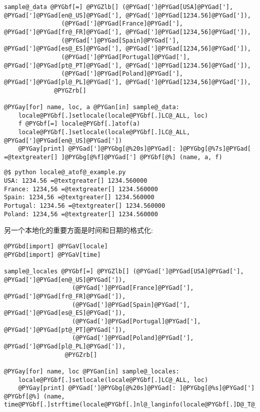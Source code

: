 \documentclass[letterpaper,10pt,english]{manual}
\begin{document}
\begin{Verbatim}[commandchars=@\[\]]
sample@_data @PYGbf[=] @PYGZlb[] (@PYGad[']@PYGad[USA]@PYGad['], @PYGad[']@PYGad[en@_US]@PYGad['], @PYGad[']@PYGad[1234.56]@PYGad[']),
                (@PYGad[']@PYGad[France]@PYGad['], @PYGad[']@PYGad[fr@_FR]@PYGad['], @PYGad[']@PYGad[1234,56]@PYGad[']),
                (@PYGad[']@PYGad[Spain]@PYGad['], @PYGad[']@PYGad[es@_ES]@PYGad['], @PYGad[']@PYGad[1234,56]@PYGad[']),
                (@PYGad[']@PYGad[Portugal]@PYGad['], @PYGad[']@PYGad[pt@_PT]@PYGad['], @PYGad[']@PYGad[1234.56]@PYGad[']),
                (@PYGad[']@PYGad[Poland]@PYGad['], @PYGad[']@PYGad[pl@_PL]@PYGad['], @PYGad[']@PYGad[1234,56]@PYGad[']),
              @PYGZrb[]

@PYGay[for] name, loc, a @PYGan[in] sample@_data:
    locale@PYGbf[.]setlocale(locale@PYGbf[.]LC@_ALL, loc)
    f @PYGbf[=] locale@PYGbf[.]atof(a)
    locale@PYGbf[.]setlocale(locale@PYGbf[.]LC@_ALL, @PYGad[']@PYGad[en@_US]@PYGad['])
    @PYGay[print] @PYGad[']@PYGbg[@%20s]@PYGad[: ]@PYGbg[@%7s]@PYGad[ =@textgreater[] ]@PYGbg[@%f]@PYGad['] @PYGbf[@%] (name, a, f)
\end{Verbatim}

\begin{Verbatim}[commandchars=@\[\]]
@$ python locale@_atof@_example.py
USA: 1234.56 =@textgreater[] 1234.560000
France: 1234,56 =@textgreater[] 1234.560000
Spain: 1234,56 =@textgreater[] 1234.560000
Portugal: 1234.56 =@textgreater[] 1234.560000
Poland: 1234,56 =@textgreater[] 1234.560000
\end{Verbatim}

另一个本地化的重要方面是时间和日期的格式化:

\begin{Verbatim}[commandchars=@\[\]]
@PYGbd[import] @PYGaV[locale]
@PYGbd[import] @PYGaV[time]

sample@_locales @PYGbf[=] @PYGZlb[] (@PYGad[']@PYGad[USA]@PYGad['], @PYGad[']@PYGad[en@_US]@PYGad[']),
                   (@PYGad[']@PYGad[France]@PYGad['], @PYGad[']@PYGad[fr@_FR]@PYGad[']),
                   (@PYGad[']@PYGad[Spain]@PYGad['], @PYGad[']@PYGad[es@_ES]@PYGad[']),
                   (@PYGad[']@PYGad[Portugal]@PYGad['], @PYGad[']@PYGad[pt@_PT]@PYGad[']),
                   (@PYGad[']@PYGad[Poland]@PYGad['], @PYGad[']@PYGad[pl@_PL]@PYGad[']),
                 @PYGZrb[]

@PYGay[for] name, loc @PYGan[in] sample@_locales:
    locale@PYGbf[.]setlocale(locale@PYGbf[.]LC@_ALL, loc)
    @PYGay[print] @PYGad[']@PYGbg[@%20s]@PYGad[: ]@PYGbg[@%s]@PYGad['] @PYGbf[@%] (name, time@PYGbf[.]strftime(locale@PYGbf[.]nl@_langinfo(locale@PYGbf[.]D@_T@_FMT)))
\end{Verbatim}
\end{document}
